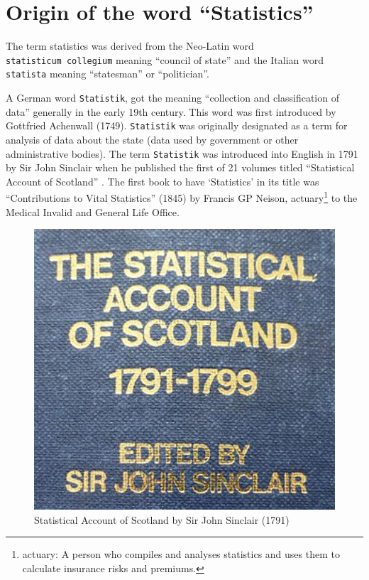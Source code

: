 \documentclass[
]{book}
\begin{document}
\hypertarget{origin-of-the-word-statistics}{%
\section{Origin of the word ``Statistics''}\label{origin-of-the-word-statistics}}

The term statistics was derived from the Neo-Latin word \texttt{statisticum\ collegium} meaning ``council of state'' and the Italian word \texttt{statista} meaning ``statesman'' or ``politician''.

A German word \texttt{Statistik}, got the meaning ``collection and classification of data'' generally in the early 19th century. This word was first introduced by Gottfried Achenwall (1749). \texttt{Statistik} was originally designated as a term for analysis of data about the state (data used by government or other administrative bodies). The term \texttt{Statistik} was introduced into English in 1791 by Sir John Sinclair when he published the first of 21 volumes titled ``Statistical Account of Scotland'' \citep{ball}. The first book to have `Statistics' in its title was ``Contributions to Vital Statistics'' (1845) by Francis GP Neison, actuary\footnote{actuary: A person who compiles and analyses statistics and uses them to calculate insurance risks and premiums.} to the Medical Invalid and General Life Office.

\begin{figure}

{\centering \includegraphics[width=4.44in]{images/history1} 

}

\caption{Statistical Account of Scotland by Sir John Sinclair (1791)}\label{fig:scotland}
\end{figure}
\end{document}
